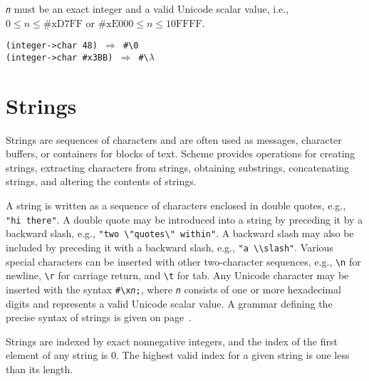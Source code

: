 \texttt{\textit{n}} must be an exact integer and a valid Unicode
scalar value, i.e., \(0 \leq n \leq \mathrm{\#xD7FF}\) or
\(\mathrm{\#xE000} \leq n \leq \mathrm{10FFFF}\).

\begin{alltt}
(integer-\textgreater{}char 48) \(\Rightarrow\) \#{}\textbackslash{}0
(integer-\textgreater{}char \#{}x3BB) \(\Rightarrow\) \#{}\textbackslash{}\(\lambda\)
\end{alltt}

\section{\label{objects_g114}\label{objects_h8}Strings\label{objects_SECTSTRINGS}}



\label{objects_s212}Strings are sequences of characters and are often used as messages,
character buffers, or containers for blocks of text.
Scheme provides operations for creating strings, extracting characters from
strings, obtaining substrings, concatenating strings, and altering the contents
of strings.


A string is written as a sequence of characters enclosed in
\label{objects_s213}\label{objects_s214}double quotes, e.g., \texttt{"hi there"}.
A double quote may be introduced into a string by preceding it by a backward
slash, e.g., \texttt{"two \textbackslash{}"quotes\textbackslash{}" within"}.
A backward slash may also be included by preceding it with a backward slash,
e.g., \texttt{"a \textbackslash{}\textbackslash{}slash"}.
Various special characters can be inserted
with other two-character sequences, e.g., \texttt{\textbackslash{}n} for newline, \texttt{\textbackslash{}r}
for carriage return, and \texttt{\textbackslash{}t} for tab.
Any Unicode character may be inserted with the syntax \texttt{\#{}\textbackslash{}x\textit{n};},
where \texttt{\textit{n}} consists of one or more hexadecimal digits and represents
a valid Unicode scalar value.
A grammar defining the precise syntax of strings is given on
page \pageref{grammar_grammar_strings}.


Strings are indexed by exact nonnegative integers, and the index of
the first element of any string is 0.
The highest valid index for a given string is one less than its length.


